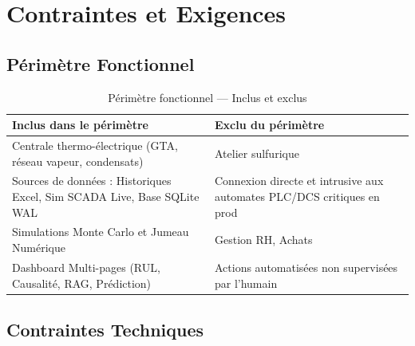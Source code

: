 \section{Contraintes et Exigences}
\label{sec:contraintes}

\subsection{Périmètre Fonctionnel}
\label{subsec:perimetre}

\begin{table}[H]
\centering
\caption{Périmètre fonctionnel — Inclus et exclus}
\label{tab:perimetre}
\begin{center}
\scriptsize
\begin{tabularx}{\textwidth}{X X}
  \cellcolor{green!15}\textbf{Inclus dans le périmètre} & \cellcolor{red!15}\textbf{Exclu du périmètre} \\
  \midrule
  Centrale thermo-électrique (GTA, réseau vapeur, condensats) & Atelier sulfurique \\
  Sources de données : Historiques Excel, Sim SCADA Live, Base SQLite WAL & Connexion directe et intrusive aux automates PLC/DCS critiques en prod \\
  Simulations Monte Carlo et Jumeau Numérique & Gestion RH, Achats \\
  Dashboard Multi-pages (RUL, Causalité, RAG, Prédiction) & Actions automatisées non supervisées par l'humain \\
  \bottomrule
\end{tabularx}
\end{center}
\end{table}

\subsection{Contraintes Techniques}
\label{subsec:contraintes_tech}

